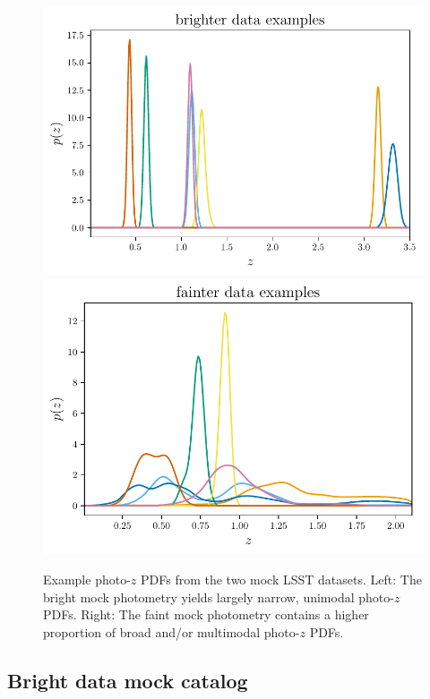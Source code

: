 \documentclass[\docopts]{\docclass}
\newcommand{\pz}{photo-$z$ PDF}
\newcommand{\mgdata}{bright\xspace}
\newcommand{\Mgdata}{Bright\xspace}
\newcommand{\ssdata}{faint\xspace}
\begin{document}
\begin{figure}
  \begin{center}
    \includegraphics[width=\columnwidth]{graham_pzs.pdf}
    \includegraphics[width=\columnwidth]{schmidt_pzs.pdf}
    \caption{
    Example \pz s from the two mock LSST datasets.
    Left: The \mgdata mock photometry yields largely narrow, unimodal \pz s.
    Right: The \ssdata mock photometry contains a higher proportion of broad 
and/or multimodal \pz s.
    \label{fig:example_pzs}}
  \end{center}
\end{figure}

\subsection{\Mgdata data mock catalog}
\label{sec:graham}
\end{document}
